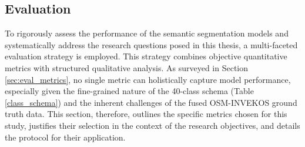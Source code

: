 \documentclass{report}
\begin{document}
\paragraph{ }
\subsection{Evaluation}
To rigorously assess the performance of the semantic segmentation models and systematically address the research questions posed in this thesis, a multi-faceted evaluation strategy is employed. This strategy combines objective quantitative metrics with structured qualitative analysis. As surveyed in Section \ref{sec:eval_metrics}, no single metric can holistically capture model performance, especially given the fine-grained nature of the 40-class schema (Table \ref{class_schema})  and the inherent challenges of the fused OSM-INVEKOS ground truth data. This section, therefore, outlines the specific metrics chosen for this study, justifies their selection in the context of the research objectives, and details the protocol for their application.
\end{document}
